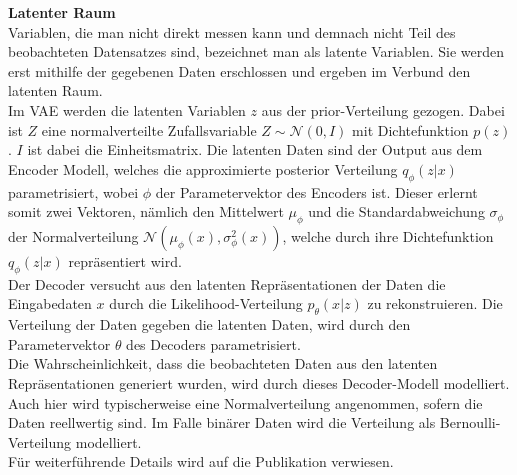 \documentclass[%
thesis=student,%
coverpage=false,%
titlepage=false,%
headmarks=true, %
german,%
font=libertine, %
math=newpxtx, %
BCOR=5mm,%
coverBCOR=11mm%
]{tumbook}
\theoremstyle{break}
\begin{document}
\newpage
\textbf{Latenter Raum}\\
Variablen, die man nicht direkt messen kann und demnach nicht Teil des beobachteten Datensatzes sind, bezeichnet man als latente Variablen. Sie werden erst mithilfe der gegebenen Daten erschlossen und ergeben im Verbund den latenten Raum.\\
Im VAE werden die latenten Variablen $z$ aus der prior-Verteilung gezogen. Dabei ist $Z$ eine normalverteilte Zufallsvariable $Z \sim \mathcal{N}(0,I)$ mit Dichtefunktion $p(z)$. $I$ ist dabei die Einheitsmatrix. Die latenten Daten sind der Output aus dem Encoder Modell, welches die  approximierte posterior Verteilung $q_\phi(z|x)$ parametrisiert, wobei $\phi$ der Parametervektor des Encoders ist. Dieser erlernt somit zwei Vektoren, nämlich den Mittelwert \( \mu_\phi \) und die Standardabweichung \( \sigma_\phi \) der Normalverteilung $\mathcal{N}(\mu_\phi(x),\sigma_\phi^2(x))$, welche durch ihre Dichtefunktion $q_\phi(z|x)$ repräsentiert wird.\\
Der Decoder versucht aus den latenten Repräsentationen der Daten die Eingabedaten $x$ durch die Likelihood-Verteilung $p_\theta(x|z)$  zu rekonstruieren. Die Verteilung der Daten gegeben die latenten Daten, wird durch den Parametervektor $\theta$ des Decoders parametrisiert.\\
Die  Wahrscheinlichkeit, dass die beobachteten Daten aus den latenten Repräsentationen generiert wurden, wird durch dieses Decoder-Modell modelliert. Auch hier wird typischerweise eine Normalverteilung angenommen, sofern die  Daten reellwertig sind. Im Falle binärer Daten wird die Verteilung als Bernoulli-Verteilung modelliert. \\ Für weiterführende Details wird auf die Publikation \cite{Auto-EncodingVariationalBayes} verwiesen.\\
\end{document}
